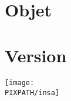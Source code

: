 
\maketitle

\thispagestyle{empty}

\hfill\\
\vfill

\section*{Objet}
\Object

\section*{Version}
\Version

\begin{center}
    \texttt{[image: \\PIXPATH/insa]}\hfill\\
\end{center}

\pagebreak
